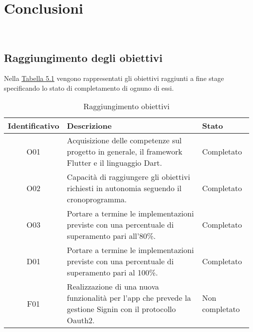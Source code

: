 
\chapter{Conclusioni}
\label{cap:conclusioni}

\\

\section{Raggiungimento degli obiettivi}
Nella \hyperref[tab:Raggiungimento obiettivi]{Tabella 5.1} vengono rappresentati gli obiettivi raggiunti a fine stage specificando lo stato di completamento di ognuno di essi.
\begin{center}
	\begin{table}[h!]
		
		\label{tab:Raggiungimento obiettivi}
		\begin{tabularx}{\textwidth}{|c|p{7cm}|p{2.4cm}|}
			
			\hline
			\textbf{Identificativo} & \centering\textbf{Descrizione} & \textbf{Stato}  \\\hline
			
			O01 & Acquisizione delle competenze sul progetto in generale, il framework Flutter e il linguaggio Dart.  & Completato\\
			\hline
			O02 & Capacità di raggiungere gli obiettivi richiesti in autonomia seguendo il cronoprogramma.  & Completato\\
			\hline	
			O03 & Portare a termine le implementazioni previste con una percentuale di superamento pari all’80\%.  & Completato\\
			\hline
			D01 & Portare a termine le implementazioni previste con una percentuale di superamento pari al 100\%.  & Completato\\
			\hline
			F01 & Realizzazione di una nuova funzionalità per l'app che prevede la gestione Signin con il protocollo Oauth2. & Non completato\\
			\hline	
		\end{tabularx}
		\vspace{0.3cm}
		\caption{Raggiungimento obiettivi}
	\end{table}
\end{center}

